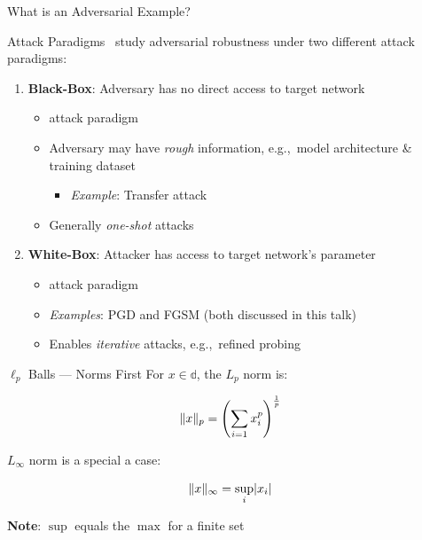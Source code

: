 \begin{frame}{What is an Adversarial Example?}
\end{frame}


\begin{frame}{Attack Paradigms}
  \madry\ study adversarial robustness under two different attack paradigms:
  \vfill
  \begin{enumerate}[<+->]
    \item \textbf{Black-Box}: Adversary has no direct access to target network
      \begin{itemize}[<+->]
        \setlength\itemsep{6pt}
        \item {} attack paradigm
        \item Adversary may have \textit{rough} information, e.g.,~model architecture \& training dataset
          \begin{itemize}
            \item \textit{Example}: Transfer attack
          \end{itemize}
        \item Generally \textit{one-shot} attacks
      \end{itemize}
    \vfill
    \item \textbf{White-Box}: Attacker has access to target network's parameter
      \begin{itemize}
        \setlength\itemsep{6pt}
        \item {} attack paradigm
        \item \textit{Examples}: PGD and FGSM (both discussed in this talk)
        \item Enables \textit{iterative} attacks, e.g.,~refined probing
      \end{itemize}
  \end{enumerate}
\end{frame}


\begin{frame}{$\ell_{p}$ Balls --- Norms First}
  For ${x \in \mathbb{d}}$, the $L_{p}$ norm is:

  \begin{equation}\label{eq:LpNorm}
    \lVert x\rVert_{p} = \left( \sum_{i=1} x_{i}^{p}  \right)^{\frac{1}{p}}
  \end{equation}

  $L_{\infty}$ norm is a special a case:

  \begin{equation}\label{eq:LinftyNorm}
    \lVert x\rVert_{\infty} = \sup_{i} \lvert x_i\rvert
  \end{equation}

  \begin{center}
    \textbf{Note}: $\sup$ equals the $\max$ for a finite set
  \end{center}
\end{frame}

